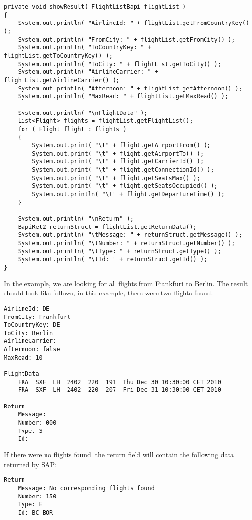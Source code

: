 \begin{Verbatim}[frame=single,label=Printing the results]
private void showResult( FlightListBapi flightList )
{
    System.out.println( "AirlineId: " + flightList.getFromCountryKey() );
    System.out.println( "FromCity: " + flightList.getFromCity() );
    System.out.println( "ToCountryKey: " + flightList.getToCountryKey() );
    System.out.println( "ToCity: " + flightList.getToCity() );
    System.out.println( "AirlineCarrier: " + flightList.getAirlineCarrier() );
    System.out.println( "Afternoon: " + flightList.getAfternoon() );
    System.out.println( "MaxRead: " + flightList.getMaxRead() );

    System.out.println( "\nFlightData" );
    List<Flight> flights = flightList.getFlightList();
    for ( Flight flight : flights )
    {
        System.out.print( "\t" + flight.getAirportFrom() );
        System.out.print( "\t" + flight.getAirportTo() );
        System.out.print( "\t" + flight.getCarrierId() );
        System.out.print( "\t" + flight.getConnectionId() );
        System.out.print( "\t" + flight.getSeatsMax() );
        System.out.print( "\t" + flight.getSeatsOccupied() );
        System.out.println( "\t" + flight.getDepartureTime() );
    }

    System.out.println( "\nReturn" );
    BapiRet2 returnStruct = flightList.getReturnData();
    System.out.println( "\tMessage: " + returnStruct.getMessage() );
    System.out.println( "\tNumber: " + returnStruct.getNumber() );
    System.out.println( "\tType: " + returnStruct.getType() );
    System.out.println( "\tId: " + returnStruct.getId() );
}
\end{Verbatim}

In the example, we are looking for all flights from Frankfurt to Berlin.
The result should look like follows, in this example, there were two flights found.

\begin{Verbatim}[frame=single,label=A successful result]
AirlineId: DE
FromCity: Frankfurt
ToCountryKey: DE
ToCity: Berlin
AirlineCarrier:
Afternoon: false
MaxRead: 10

FlightData
	FRA  SXF  LH  2402  220  191  Thu Dec 30 10:30:00 CET 2010
	FRA  SXF  LH  2402  220  207  Fri Dec 31 10:30:00 CET 2010

Return
	Message:
	Number: 000
	Type: S
	Id:
\end{Verbatim}

If there were no flights found, the return field will contain the following data returned by SAP:

\begin{Verbatim}[frame=single,label=The result when no data was found]
Return
	Message: No corresponding flights found
	Number: 150
	Type: E
	Id: BC_BOR
\end{Verbatim}


